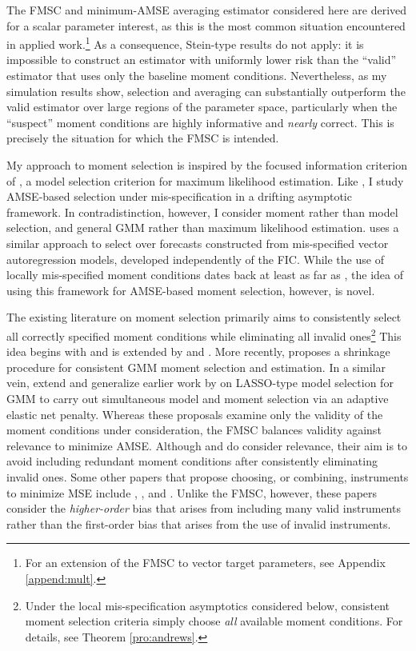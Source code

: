 The FMSC and minimum-AMSE averaging estimator considered here are derived for a scalar parameter interest, as this is the most common situation encountered in applied work.\footnote{For an extension of the FMSC to vector target parameters, see Appendix \ref{append:mult}.}
As a consequence, Stein-type results do not apply: it is impossible to construct an estimator with uniformly lower risk than the ``valid'' estimator that uses only the baseline moment conditions.
Nevertheless, as my simulation results show, selection and averaging can substantially outperform the valid estimator over large regions of the parameter space, particularly when the ``suspect'' moment conditions are highly informative and \emph{nearly} correct.
This is precisely the situation for which the FMSC is intended.

My approach to moment selection is inspired by the focused information criterion of \citet{ClaeskensHjort2003}, a model selection criterion for maximum likelihood estimation. 
Like \citet{ClaeskensHjort2003}, I study AMSE-based selection under mis-specification in a drifting asymptotic framework. 
In contradistinction, however, I consider moment rather than model selection, and general GMM rather than maximum likelihood estimation.
\cite{Schorfheide2005} uses a similar approach to select over forecasts constructed from mis-specified vector autoregression models, developed independently of the FIC. 
While the use of locally mis-specified moment conditions dates back at least as far as \cite{Newey1985}, the idea of using this framework for AMSE-based moment selection, however, is novel.

The existing literature on moment selection primarily aims to consistently select all correctly specified moment conditions while eliminating all invalid ones\footnote{Under the local mis-specification asymptotics considered below, consistent moment selection criteria simply choose \emph{all} available moment conditions. For details, see Theorem \ref{pro:andrews}.}
This idea begins with \cite{Andrews1999} and is extended by  \cite{AndrewsLu} and \cite{HongPrestonShum}.
More recently, \cite{Liao} proposes a shrinkage procedure for consistent GMM moment selection and estimation. 
In a similar vein, \cite{CanerHanLee} extend and generalize earlier work by \cite{Caner2009} on LASSO-type model selection for GMM to carry out simultaneous model and moment selection via an adaptive elastic net penalty. 
Whereas these proposals examine only the validity of the moment conditions under consideration, the FMSC balances validity against relevance to minimize AMSE.
Although \cite{HallPeixe2003} and \cite{ChengLiao} do consider relevance, their aim is to avoid including redundant moment conditions after consistently eliminating invalid ones.
Some other papers that propose choosing, or combining, instruments to minimize MSE include \cite{DonaldNewey2001}, \cite{DonaldImbensNewey2009}, and \cite{KuersteinerOkui2010}.
Unlike the FMSC, however, these papers consider the \emph{higher-order} bias that arises from including many valid instruments rather than the first-order bias that arises from the use of invalid instruments.

